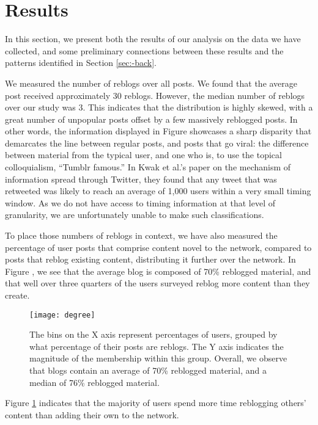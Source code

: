 \section{Results}
\label{sec:-res}
In this section, we present both the results of our analysis on the 
data we have collected, and some preliminary connections between these 
results and the patterns identified in Section \ref{sec:-back}.


We measured the number of reblogs over all posts.  We found that the 
average post received approximately 30 reblogs.  However, the median 
number of reblogs over our study was 3.  This indicates that the 
distribution is highly skewed, with a great number of unpopular posts 
offset by a few massively reblogged posts.  In other words, the 
information displayed in Figure \cite{fig:-distance} showcases a 
sharp disparity that demarcates the line between regular posts, and 
posts that go viral: the difference between material from the typical 
user, and one who is, to use the topical colloquialism, 
``Tumblr famous.''  In Kwak et al.'s paper\cite{kwak2010twitter} on 
the mechanism of information spread through Twitter, they found that 
any tweet that was retweeted was likely to reach an average of 1,000 
users within a very small timing window.  As we do not have access to 
timing information at that level of granularity, we are unfortunately 
unable to make such classifications.


To place those numbers of reblogs in context, we have also measured 
the percentage of user posts that comprise content novel to the 
network, compared to posts that reblog existing content, distributing 
it further over the network.  In Figure \cite{fig:-deg}, we see that 
the average blog is composed of 70\% reblogged material, and that well 
over three quarters of the users surveyed reblog more content than they 
create.  



\begin{figure}[bht]
\centering
 \texttt{[image: degree]}
  \caption{The bins on the X axis represent percentages of users, grouped by what percentage of their posts are reblogs.  The Y axis indicates the magnitude of the membership within this group.  Overall, we observe that blogs contain an average of 70\% reblogged material, and a median of 76\% reblogged material.}
  \label{fig:-deg}
\end{figure}

Figure \ref{fig:-deg} indicates that the majority of users spend more 
time reblogging others' content than adding their own to the network.


